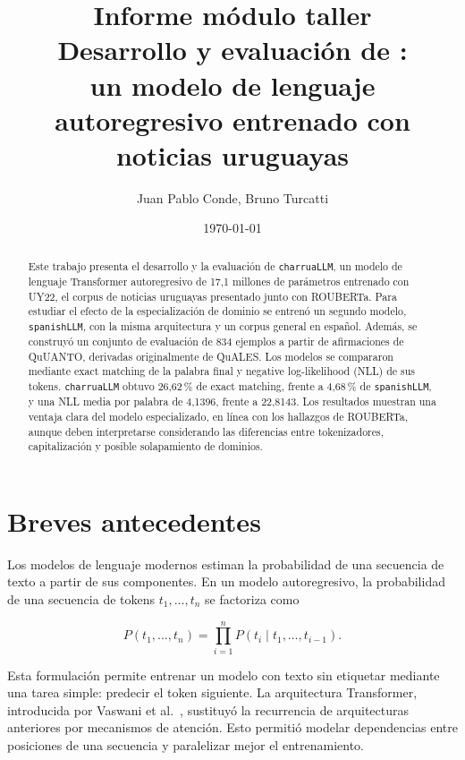 \documentclass[11pt,a4paper]{article}
\title{\textbf{Informe módulo taller}\\[0.5em]
\large Desarrollo y evaluación de \charrua:\\
un modelo de lenguaje autoregresivo entrenado con noticias uruguayas}
\author{Juan Pablo Conde, Bruno Turcatti}
\date{\today}
\newcommand{\charrua}{\texttt{charruaLLM}}
\newcommand{\spanishmodel}{\texttt{spanishLLM}}
\begin{document}
\maketitle
\thispagestyle{empty}

\begin{abstract}
Este trabajo presenta el desarrollo y la evaluación de \charrua, un modelo de
lenguaje Transformer autoregresivo de 17,1 millones de parámetros entrenado con
UY22, el corpus de noticias uruguayas presentado junto con ROUBERTa. Para
estudiar el efecto de la especialización de dominio se entrenó un segundo
modelo, \spanishmodel, con la misma arquitectura y un corpus general en español.
Además, se construyó un conjunto de evaluación de 834 ejemplos a partir de
afirmaciones de QuUANTO, derivadas originalmente de QuALES. Los modelos se
compararon mediante exact matching de la palabra final y negative
log-likelihood (NLL) de sus tokens. \charrua{} obtuvo 26,62\,\% de exact
matching, frente a 4,68\,\% de \spanishmodel, y una NLL media por palabra de
4,1396, frente a 22,8143. Los resultados muestran una ventaja clara del modelo
especializado, en línea con los hallazgos de ROUBERTa, aunque deben
interpretarse considerando las diferencias entre tokenizadores, capitalización
y posible solapamiento de dominios.
\end{abstract}

\clearpage
\tableofcontents
\clearpage


\section{Breves antecedentes}

Los modelos de lenguaje modernos estiman la probabilidad de una secuencia de
texto a partir de sus componentes. En un modelo autoregresivo, la probabilidad
de una secuencia de tokens $t_1,\ldots,t_n$ se factoriza como

\begin{equation}
    P(t_1,\ldots,t_n)
    = \prod_{i=1}^{n} P(t_i \mid t_1,\ldots,t_{i-1}).
\end{equation}

Esta formulación permite entrenar un modelo con texto sin etiquetar mediante
una tarea simple: predecir el token siguiente. La arquitectura Transformer,
introducida por Vaswani et al.~\cite{vaswani2017}, sustituyó la recurrencia de
arquitecturas anteriores por mecanismos de atención. Esto permitió modelar
dependencias entre posiciones de una secuencia y paralelizar mejor el
entrenamiento.
\end{document}
